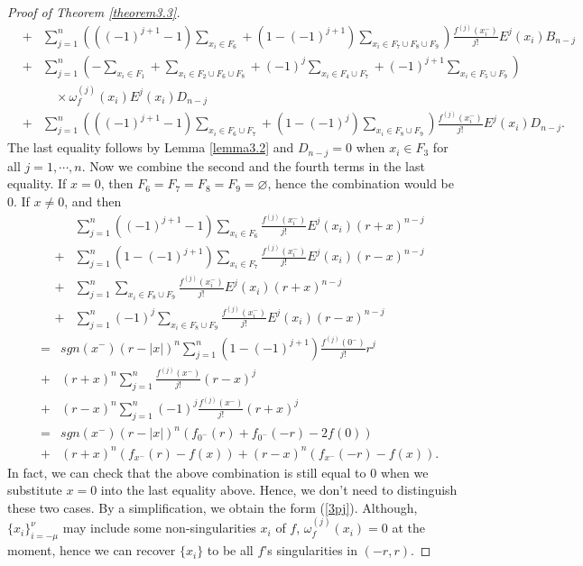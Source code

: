 \documentclass{article}
\begin{document}
\begin{proof}[Proof of Theorem \ref{theorem3.3}]
\begin{eqnarray*}
    &+&\sum_{j=1}^{n}\left(((-1)^{j+1}-1)\sum_{x_{i}\in F_{6}}+(1-(-1)^{j+1})\sum_{x_{i}\in F_{7}\cup F_{8}\cup F_{9}}\right)\frac{f^{(j)}(x_{i}^{-})}{j!}E^{j}(x_{i})B_{n-j}\\
    &+&\sum_{j=1}^{n}\left(-\sum_{x_{i}\in F_{1}}+\sum_{x_{i}\in F_{2} \cup F_{6} \cup F_{8}}+(-1)^{j}\sum_{x_{i}\in F_{4}\cup F_{7}}+(-1)^{j+1}\sum_{x_{i}\in F_{5}\cup F_{9}}\right)\\
    &&\quad \times \omega_{f}^{(j)}(x_{i})E^{j}(x_{i})D_{n-j}\\
    &+&\sum_{j=1}^{n}\left(((-1)^{j+1}-1)\sum_{x_{i}\in F_{6}\cup F_{7}}+(1-(-1)^{j})\sum_{x_{i}\in F_{8}\cup F_{9}}\right)\frac{f^{(j)}(x_{i}^{-})}{j!}E^{j}(x_{i})D_{n-j}.
\end{eqnarray*}
The last equality follows by Lemma \ref{lemma3.2} and $D_{n-j}=0$ when $x_{i}\in F_{3}$ for all $j=1, \cdots, n$.
Now we combine the second and the fourth terms in the last equality. If $x=0$, then $F_{6}=F_{7}=F_{8}=F_{9}=\varnothing$, hence the combination would be $0$. If $x\neq 0$, and then
\begin{eqnarray*}
    &&\sum_{j=1}^{n}((-1)^{j+1}-1)\sum_{x_{i}\in F_{6}}\frac{f^{(j)}(x_{i}^{-})}{j!}E^{j}(x_{i})(r+x)^{n-j}\\
    &+&\sum_{j=1}^{n}(1-(-1)^{j+1})\sum_{x_{i}\in F_{7}}\frac{f^{(j)}(x_{i}^{-})}{j!}E^{j}(x_{i})(r-x)^{n-j}\\
    &+&\sum_{j=1}^{n}\sum_{x_{i}\in F_{8}\cup F_{9}}\frac{f^{(j)}(x_{i}^{-})}{j!}E^{j}(x_{i})(r+x)^{n-j}\\
    &+&\sum_{j=1}^{n}(-1)^{j}\sum_{x_{i}\in F_{8}\cup F_{9}}\frac{f^{(j)}(x_{i}^{-})}{j!}E^{j}(x_{i})(r-x)^{n-j}
\end{eqnarray*}
\begin{eqnarray*}
    &=&sgn(x^{-})(r-|x|)^{n}\sum_{j=1}^{n}(1-(-1)^{j+1})\frac{f^{(j)}(0^{-})}{j!}r^{j}\\
    &+&(r+x)^{n}\sum_{j=1}^{n}\frac{f^{(j)}(x^{-})}{j!}(r-x)^{j}\\
    &+&(r-x)^{n}\sum_{j=1}^{n}(-1)^{j}\frac{f^{(j)}(x^{-})}{j!}(r+x)^{j}\\
    &=&sgn(x^{-})(r-|x|)^{n}(f_{0^{-}}(r)+f_{0^{-}}(-r)-2f(0))\\
    &+&(r+x)^{n}(f_{x^{-}}(r)-f(x))+(r-x)^{n}(f_{x^{-}}(-r)-f(x)).
\end{eqnarray*}
In fact, we can check that the above combination is still equal to $0$ when we substitute $x=0$ into the last equality above. Hence, we don't need to distinguish these two cases. By a simplification, we obtain the form (\ref{3pj}). Although, $\{x_{i}\}_{i=-\mu}^{\nu}$ may include some non-singularities $x_{i}$ of $f$, $\omega_{f}^{(j)}(x_{i})=0$ at the moment, hence we can recover $\{x_{i}\}$ to be all $f$'s singularities in $(-r, r)$. 


\end{proof}
\end{document}
